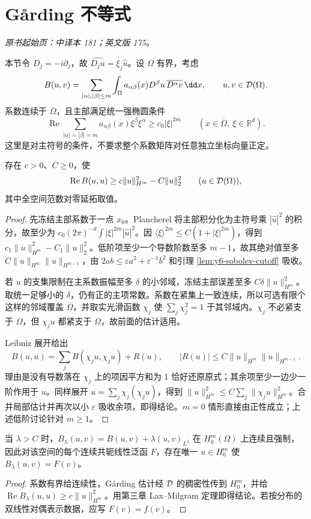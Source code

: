 \section{Gårding 不等式}\label{sec:yosida-06-08}
\noindent\textit{原书起始页：中译本 181；英文版 175。}

本节令 $D_j=-i\partial_j$，故 $\widehat{D_ju}=\xi_j\widehat u$。设 $\Omega$ 有界，考虑
\[
 B(u,v)=\sum_{|\alpha|,|\beta|\le m}\int_\Omega
 a_{\alpha\beta}(x)D^\beta u\,\overline{D^\alpha v}\,\dd x,
 \qquad u,v\in\Test(\Omega).
\]
系数连续于 $\overline\Omega$，且主部满足统一强椭圆条件
\[
 \operatorname{Re}\sum_{|\alpha|=|\beta|=m}a_{\alpha\beta}(x)\xi^\beta\xi^\alpha
 \ge c_0|\xi|^{2m}\qquad(x\in\overline\Omega,\ \xi\in\mathbb R^d).
\]
这里是对主符号的条件，不要求整个系数矩阵对任意独立坐标向量正定。

\begin{theorem}\label{thm:y6-garding}
存在 $c>0$、$C\ge0$，使
\[
 \operatorname{Re}B(u,u)\ge c\|u\|_{H^m}^2-C\|u\|_2^2
 \qquad(u\in\mathcal{D}(\Omega)),
\]
其中全空间范数对零延拓取值。
\end{theorem}
\begin{proof}
先冻结主部系数于一点 $x_0$。Plancherel 将主部积分化为主符号乘 $|\widehat u|^2$ 的积分，故至少为 $c_0(2\pi)^{-d}\int|\xi|^{2m}|\widehat u|^2$。因 $\langle\xi\rangle^{2m}\le C(1+|\xi|^{2m})$，得到 $c_1\|u\|_{H^m}^2-C_1\|u\|_2^2$。低阶项至少一个导数阶数至多 $m-1$，故其绝对值至多 $C\|u\|_{H^m}\|u\|_{H^{m-1}}$，由 $2ab\le\varepsilon a^2+\varepsilon^{-1}b^2$ 和引理 \ref{lem:y6-sobolev-cutoff} 吸收。

若 $u$ 的支集限制在主系数振幅至多 $\delta$ 的小邻域，冻结主部误差至多 $C\delta\|u\|_{H^m}^2$。取统一足够小的 $\delta$，仍有正的主项常数。系数在紧集上一致连续，所以可选有限个这样的邻域覆盖 $\overline\Omega$，并取实光滑函数 $\chi_j$ 使 $\sum_j\chi_j^2=1$ 于其邻域内。$\chi_j$ 不必紧支于 $\Omega$，但 $\chi_ju$ 都紧支于 $\Omega$，故前面的估计适用。

Leibniz 展开给出
\[
 B(u,u)=\sum_jB(\chi_ju,\chi_ju)+R(u),\qquad
 |R(u)|\le C\|u\|_{H^m}\|u\|_{H^{m-1}}.
\]
理由是没有导数落在 $\chi_j$ 上的项因平方和为 1 恰好还原原式；其余项至少一边少一阶作用于 $u$。同样展开 $u=\sum_j\chi_j(\chi_ju)$，得到 $\|u\|_{H^m}^2\le C\sum_j\|\chi_ju\|_{H^m}^2$。合并局部估计并再次以小 $\varepsilon$ 吸收余项，即得结论。$m=0$ 情形直接由正性成立；上述低阶讨论针对 $m\ge1$。
\end{proof}

\begin{corollary}[移位后强制性]
当 $\lambda>C$ 时，$B_\lambda(u,v)=B(u,v)+\lambda(u,v)_{L^2}$ 在 $H_0^m(\Omega)$ 上连续且强制，因此对该空间的每个连续共轭线性泛函 $F$，存在唯一 $u\in H_0^m$ 使 $B_\lambda(u,v)=F(v)$。
\end{corollary}
\begin{proof}
系数有界给连续性，Gårding 估计经 $\mathcal{D}$ 的稠密性传到 $H_0^m$，并给 $\operatorname{Re}B_\lambda(u,u)\ge c\|u\|_{H^m}^2$。用第三章 Lax--Milgram 定理即得结论。若按分布的双线性对偶表示数据，应写 $F(v)=f(\overline v)$。
\end{proof}

